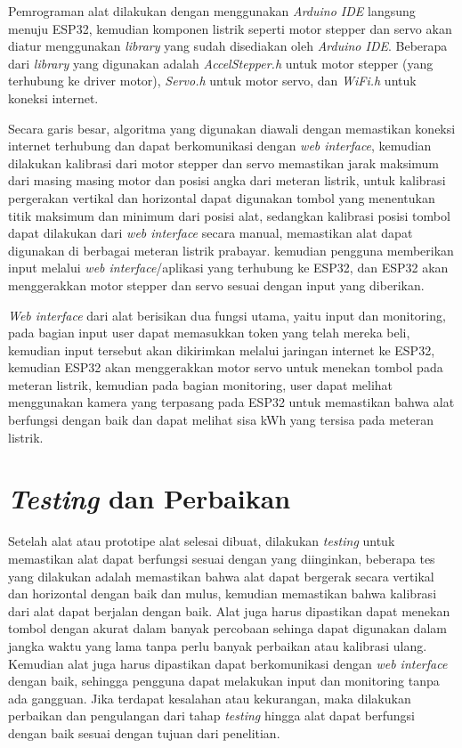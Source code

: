 Pemrograman alat dilakukan dengan menggunakan \textit{Arduino IDE} langsung menuju ESP32, kemudian komponen listrik
seperti motor stepper dan servo akan diatur menggunakan \textit{library} yang sudah disediakan oleh \textit{Arduino IDE}.
Beberapa dari \textit{library} yang digunakan adalah \textit{AccelStepper.h} untuk motor stepper (yang terhubung ke driver motor), 
\textit{Servo.h} untuk motor servo, dan \textit{WiFi.h} untuk koneksi internet. 

Secara garis besar,
algoritma yang digunakan diawali dengan memastikan koneksi internet terhubung dan dapat berkomunikasi dengan
\textit{web interface}, kemudian dilakukan
kalibrasi dari motor stepper dan servo memastikan jarak maksimum dari masing masing motor dan posisi
angka dari meteran listrik, untuk kalibrasi pergerakan vertikal dan horizontal dapat digunakan tombol yang menentukan titik
maksimum dan minimum dari posisi alat, sedangkan kalibrasi posisi tombol dapat dilakukan dari \textit{web interface} secara manual,
memastikan alat dapat digunakan di berbagai meteran listrik prabayar.
kemudian pengguna memberikan input melalui \textit{web interface}/aplikasi yang terhubung ke ESP32,
dan ESP32 akan menggerakkan motor stepper dan servo sesuai dengan input yang diberikan.

\textit{Web interface} dari alat berisikan dua fungsi utama, yaitu input dan monitoring, pada bagian input user dapat memasukkan
token yang telah mereka beli, kemudian input tersebut akan dikirimkan melalui jaringan internet ke ESP32, kemudian ESP32 akan
menggerakkan motor servo untuk menekan tombol pada meteran listrik, kemudian pada bagian monitoring, user dapat melihat menggunakan
kamera yang terpasang pada ESP32 untuk memastikan bahwa alat berfungsi dengan baik dan dapat melihat sisa kWh yang tersisa pada meteran listrik.

\section{\textit{Testing} dan Perbaikan}

Setelah alat atau prototipe alat selesai dibuat, dilakukan \textit{testing} untuk memastikan alat dapat berfungsi sesuai dengan
yang diinginkan, beberapa tes yang dilakukan adalah memastikan bahwa alat dapat bergerak secara vertikal dan horizontal dengan baik
dan mulus, kemudian memastikan bahwa kalibrasi dari alat dapat berjalan dengan baik. Alat juga harus dipastikan dapat menekan tombol
dengan akurat dalam banyak percobaan sehinga dapat digunakan dalam jangka waktu yang lama tanpa perlu banyak perbaikan atau kalibrasi ulang.
Kemudian alat juga harus dipastikan dapat berkomunikasi dengan \textit{web interface} dengan baik, sehingga pengguna dapat melakukan
input dan monitoring tanpa ada gangguan. Jika terdapat kesalahan atau kekurangan, maka dilakukan perbaikan dan pengulangan dari tahap
\textit{testing} hingga alat dapat berfungsi dengan baik sesuai dengan tujuan dari penelitian.